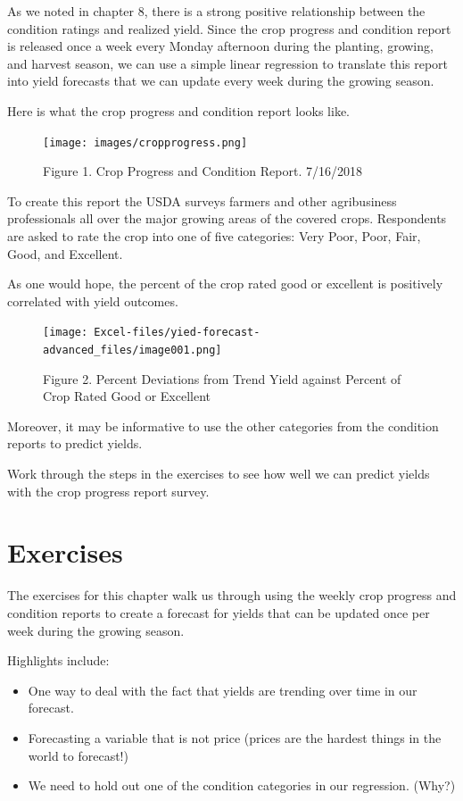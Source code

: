 \documentclass[
]{book}
\providecommand{\tightlist}{%
  \setlength{\itemsep}{0pt}\setlength{\parskip}{0pt}}
\begin{document}
As we noted in chapter 8, there is a strong positive relationship between the condition ratings and realized yield. Since the crop progress and condition report is released once a week every Monday afternoon during the planting, growing, and harvest season, we can use a simple linear regression to translate this report into yield forecasts that we can update every week during the growing season.

Here is what the crop progress and condition report looks like.

\begin{figure}
\centering
\texttt{[image: images/cropprogress.png]}
\caption{Figure 1. Crop Progress and Condition Report. 7/16/2018}
\end{figure}

To create this report the USDA surveys farmers and other agribusiness professionals all over the major growing areas of the covered crops. Respondents are asked to rate the crop into one of five categories: Very Poor, Poor, Fair, Good, and Excellent.

As one would hope, the percent of the crop rated good or excellent is positively correlated with yield outcomes.

\begin{figure}
\centering
\texttt{[image: Excel-files/yied-forecast-advanced\_files/image001.png]}
\caption{Figure 2. Percent Deviations from Trend Yield against Percent of Crop Rated Good or Excellent}
\end{figure}

Moreover, it may be informative to use the other categories from the condition reports to predict yields.

Work through the steps in the exercises to see how well we can predict yields with the crop progress report survey.

\hypertarget{exercises-11}{%
\section{Exercises}\label{exercises-11}}

The exercises for this chapter walk us through using the weekly crop progress and condition reports to create a forecast for yields that can be updated once per week during the growing season.

Highlights include:

\begin{itemize}
\tightlist
\item
  One way to deal with the fact that yields are trending over time in our forecast.
\item
  Forecasting a variable that is not price (prices are the hardest things in the world to forecast!)
\item
  We need to hold out one of the condition categories in our regression. (Why?)
\end{itemize}
\end{document}
